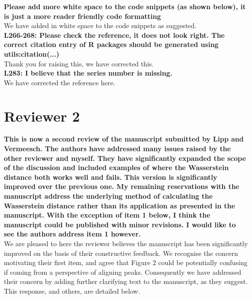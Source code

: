 \documentclass{article}[12p,a4paper]
\begin{document}
\textbf{Please add more white space to the code snippets (as shown below), it is just a more reader friendly code formatting}\\ 

We have added in white space to the code snippets as suggested.\\


\textbf{L266-268: Please check the reference, it does not look right. The correct citation entry of R packages should be generated using utils:citation(...)}\\

Thank you for raising this, we have corrected this.\\ 


\textbf{L283: I believe that the series number is missing.}\\

We have corrected the reference here.\\

\section*{Reviewer 2}

\textbf{This is now a second review of the manuscript submitted by Lipp and Vermeesch. The authors have addressed many issues raised by the other reviewer and myself. They have significantly expanded the scope of the discussion and included examples of where the Wasserstein distance both works well and fails. This version is significantly improved over the previous one. My remaining reservations with the manuscript address the underlying method of calculating the Wasserstein distance rather than its application as presented in the manuscript. With the exception of item 1 below, I think the manuscript could be published with minor revisions. I would like to see the authors address item 1 however.}\\

We are pleased to here the reviewer believes the manuscript has been significantly improved on the basis of their constructive feedback. We recognise the concern motivating their first item, and agree that Figure 2 could be potentially confusing if coming from a perspective of aligning peaks. Consequently we have addressed their concern by adding further clarifying text to the manuscript, as they suggest. This response, and others, are detailed below.\\
\end{document}
